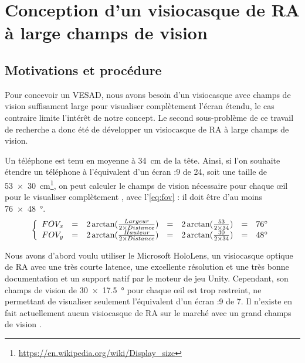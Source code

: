 \chapter{Conception d'un visiocasque de RA à large champs de vision}
\label{ch:methodology}

\section{Motivations et procédure}
Pour concevoir un VESAD, nous avons besoin d'un visiocasque avec champs de vision suffisament large pour visualiser complètement l'écran étendu, le cas contraire limite l'intérêt de notre concept. Le second sous-problème de ce travail de recherche a donc été de développer un visiocasque de RA à large champs de vision.

Un téléphone est tenu en moyenne à \SI{34}{\cm} \citep{Bababekova2011} de la tête. Ainsi, si l'on souhaite étendre un téléphone à l'équivalent d'un écran {:9} de \SI{24}{\inch}, soit une taille de \SI{53x30}{\cm}\footnote{\url{https://en.wikipedia.org/wiki/Display_size}}, on peut calculer le champs de vision nécessaire pour chaque \oe il pour le visualiser complètement , avec l'\autoref{eq:fov} : il doit être d'au moins \SI{76x48}{\degree}.
\begin{equation}
  \label{eq:fov}
  \left \{
  \begin{array}{r c c c c c l}
    FOV_x & = & 2 \arctan (\frac{Largeur}{2 \times Distance}) & = & 2 \arctan (\frac{53}{2 \times 34}) & = & \ang{76}\\
    FOV_y & = & 2 \arctan (\frac{Hauteur}{2 \times Distance}) & = & 2 \arctan (\frac{30}{2 \times 34}) & = & \ang{48}
  \end{array}
  \right .
\end{equation}


Nous avons d'abord voulu utiliser le Microsoft HoloLens, un visiocasque optique de RA avec une très courte latence, une excellente résolution et une très bonne documentation et un support natif par le moteur de jeu Unity. Cependant, son champs de vision de \SI{30x17.5}{\degree} pour chaque \oe il \citep{Kreylos2015} est trop restreint, ne permettant de visualiser seulement l'équivalent d'un écran {:9} de \SI{7}{\inch}. Il n'existe en fait actuellement aucun visiocasque de RA sur le marché avec un grand champs de vision \citep{Millette2016}.

